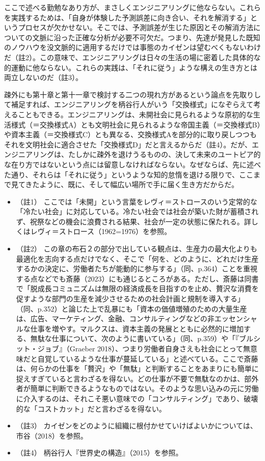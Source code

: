 ここで述べる勤勉なあり方が、まさしくエンジニアリングに他ならない。これらを実践するためは、「自身が体験した予測誤差に向き合い、それを解消する」というプロセスが欠かせない。そこでは、予測誤差が生じた原因とその解消方法についての文脈に沿った正確な分析が必要不可欠だ。つまり、先達が発見した既知のノウハウを没文脈的に適用するだけでは事態のカイゼンは望むべくもないわけだ（註2）。この意味で、エンジニアリングは日々の生活の場に密着した具体的な的運動に他ならない。これらの実践は、「それに従う」ような構えの生き方とは両立しないのだ（註3）。

疎外にも第十章と第十一章で検討する二つの現れ方があるという論点を先取りして補足すれば、エンジニアリングを柄谷行人がいう「交換様式」になぞらえて考えることもできる。エンジニアリングは、未開社会に見られるような原初的な生活様式（＝交換様式A）とも文明社会に見られるような帝国主義（＝交換様式B）や資本主義（＝交換様式C）とも異なる、交換様式Aを部分的に取り戻しつつもそれを文明社会に適合させた「交換様式D」だと言えるからだ（註4）。だが、エンジニアリングは、たしかに疎外を退けうるものの、決して未来のユートピア的な在り方ではないという点には留意しなければならない。なぜならば、先に述べた通り、それらは「それに従う」というような知的怠惰を退ける限りで、ここまで見てきたように、既に、そして幅広い場所で手に届く生き方だからだ。

\begin{itemize}
\tightlist
\item
  （註1）
  ここでは「未開」という言葉をレヴィ＝ストロースのいう定常的な「冷たい社会」に対応している。冷たい社会では社会が築いた財が蓄積されず、祝祭などの機会に浪費される結果、社会が一定の状態に保たれる。詳しくはレヴィ＝ストロース（1962=1976）\cite{LeviStrauss}を参照。
\item
  （註2）
  この章の布石２の部分で出している観点は、生産力の最大化よりも最適化を志向する点だけでなく、そこで「何を、どのように、どれだけ生産するかの決定に、労働者たちが能動的に参与する」（同、p.364）ことを重視する点などでも斎藤（2023）\cite{Saito}にも通じるところがある。ただし、斎藤は同書で「脱成長コミュニズムは無限の経済成長を目指すのを止め、贅沢な消費を促すような部門の生産を減少させるための社会計画と規制を導入する」（同、p.352）と論じた上で乱暴にも「資本の価値増殖のための大量生産は、広告、マーケティング、金融、コンサルティングなどの非エッセンシャルな仕事を増やす。マルクスは、資本主義の発展とともに必然的に増加する、無駄な仕事について、次のように書いている」（同、p.359）や「『ブルシット・ジョブ』（Graeber
  2018）、つまり労働者自身さえも社会にとって無意味だと自覚しているような仕事が蔓延している」と述べている。ここで斎藤は、何らかの仕事を「贅沢」や「無駄」と判断することをあまりにも簡単に捉えすぎていると言わざるを得ない。どの仕事が不要で無駄なのかは、部外者が簡単に判断できるようなものではない。そのような思い込みの元に労働に介入するのは、それこそ悪い意味での「コンサルティング」であり、破壊的な「コストカット」だと言わざるを得ない。
\item
  （註3）
  カイゼンをどのように組織に根付かせていけばよいかについては、市谷（2018）\cite{Ichitani}を参照。
\item
  （註4） 柄谷行人『世界史の構造』（2015）を参照。
\end{itemize}

